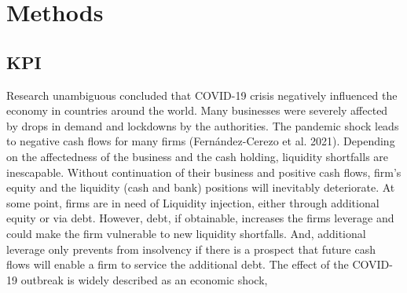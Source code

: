 
\chapter{Methods} %

\label{Chapter4} %


\section{KPI}

Research unambiguous concluded that COVID-19 crisis negatively influenced the economy in countries around the world. Many businesses were severely affected by drops in demand and lockdowns by the authorities. The pandemic shock leads to negative cash flows for many firms (Fernández-Cerezo et al. 2021). Depending on the affectedness of the business and the cash holding, liquidity shortfalls are inescapable. 
Without continuation of their business and positive cash flows, firm’s equity and the liquidity (cash and bank) positions will inevitably deteriorate. At some point, firms are in need of Liquidity injection, either through additional equity or via debt. However, debt, if obtainable, increases the firms leverage and could make the firm vulnerable to new liquidity shortfalls. And, additional leverage only prevents from insolvency if there is a prospect that future cash flows will enable a firm to service the additional debt.
The effect of the COVID-19 outbreak is widely described as an economic shock,

